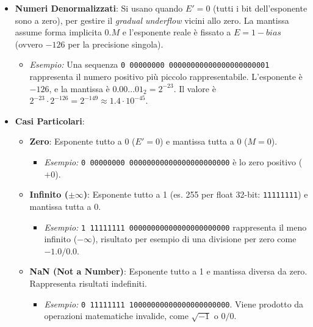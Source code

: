 \documentclass[12pt, a4paper]{article}
\begin{document}
\begin{itemize}
    \item \textbf{Numeri Denormalizzati}: Si usano quando $E' = 0$ (tutti i bit dell'esponente sono a zero), per gestire il \textit{gradual underflow} vicini allo zero. La mantissa assume forma implicita $0.M$ e l'esponente reale è fissato a $E = 1 - \textit{bias}$ (ovvero $-126$ per la precisione singola).\\
    \begin{itemize} 
        \item \textit{Esempio:} Una sequenza \texttt{0 00000000 00000000000000000000001} rappresenta il numero positivo più piccolo rappresentabile. L'esponente è $-126$, e la mantissa è $0.00...01_2 = 2^{-23}$. Il valore è $2^{-23} \cdot 2^{-126} = 2^{-149} \approx 1.4 \cdot 10^{-45}$.
    \end{itemize}

    \item \textbf{Casi Particolari}:
    \begin{itemize}
        \item \textbf{Zero}: Esponente tutto a 0 ($E'=0$) e mantissa tutta a 0 ($M=0$).
        \begin{itemize}
            \item \textit{Esempio:} \texttt{0 00000000 00000000000000000000000} è lo zero positivo ($+0$).
        \end{itemize}
        
        \item \textbf{Infinito ($\pm\infty$)}: Esponente tutto a 1 (es. 255 per float 32-bit: \texttt{11111111}) e mantissa tutta a 0.
        \begin{itemize}
            \item \textit{Esempio:} \texttt{1 11111111 00000000000000000000000} rappresenta il meno infinito ($-\infty$), risultato per esempio di una divisione per zero come $-1.0 / 0.0$.
        \end{itemize}
        
        \item \textbf{NaN (Not a Number)}: Esponente tutto a 1 e mantissa diversa da zero. Rappresenta risultati indefiniti.
        \begin{itemize}
            \item \textit{Esempio:} \texttt{0 11111111 10000000000000000000000}. Viene prodotto da operazioni matematiche invalide, come $\sqrt{-1}$ o $0/0$.
        \end{itemize}
    \end{itemize}
\end{itemize}
\end{document}
